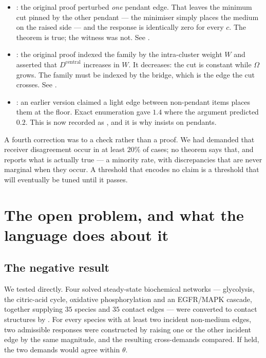 \documentclass[11pt,twocolumn,a4paper]{article}
\theoremstyle{plain}
\theoremstyle{definition}
\theoremstyle{remark}
\newcommand{\Om}{\Omega}
\newcommand{\dem}{D}
\begin{document}
\begin{itemize}[leftmargin=1.4em]
\item {}: the original proof perturbed \emph{one}
      pendant edge. That leaves the minimum cut pinned by the other
      pendant --- the minimiser simply places the medium on the raised
      side --- and the response is identically zero for every $c$. The
      theorem is true; the witness was not. See .
\item {}: the original proof indexed the family by the
      intra-cluster weight $W$ and asserted that
      $\dem^{\mathrm{central}}$ increases in $W$. It decreases: the cut
      is constant while $\Om$ grows. The family must be indexed by the
      bridge, which is the edge the cut crosses. See
      .
\item {}: an earlier version claimed a light edge between
      non-pendant items places them at the floor. Exact enumeration gave
      $1.4$ where the argument predicted $0.2$. This is now recorded as
      , and it is why  insists
      on pendants.
\end{itemize}

\noindent A fourth correction was to a check rather than a proof. We had
demanded that receiver disagreement occur in at least $20\%$ of cases;
no theorem says that, and  reports what is
actually true --- a minority rate, with discrepancies that are never
marginal when they occur. A threshold that encodes no claim is a
threshold that will eventually be tuned until it passes.

\section{The open problem, and what the language does about it}
\label{sec:open}

\subsection{The negative result}

We tested  directly. Four solved steady-state
biochemical networks --- glycolysis, the citric-acid cycle, oxidative
phosphorylation and an EGFR/MAPK cascade, together supplying $35$
species and $35$ contact edges --- were converted to contact structures
by . For every species with at least two incident
non-medium edges, two admissible responses were constructed by raising
one or the other incident edge by the same magnitude, and the resulting
cross-demands compared. If  held, the two demands
would agree within $\theta$.
\end{document}
